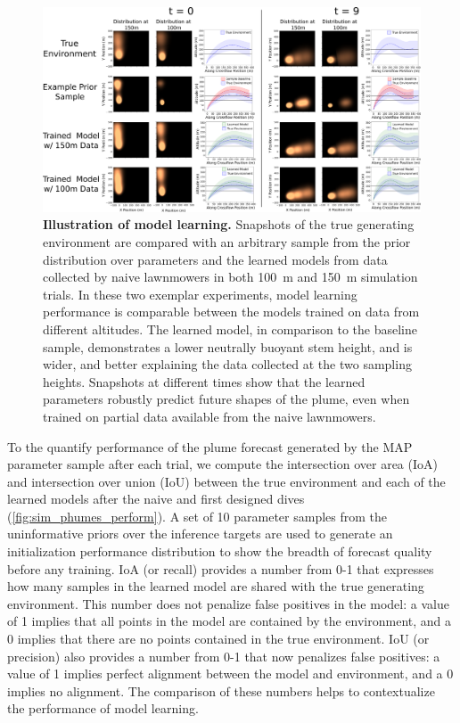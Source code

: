 \begin{figure}[h!]
    \centering
    \includegraphics[width=\columnwidth]{figures/sim_mod.png}
    \caption{\textbf{Illustration of model learning.} Snapshots of the true generating environment are compared with an arbitrary sample from the prior distribution over \PHUMES parameters and the learned models from data collected by naive lawnmowers in both \SI{100}{\meter} and \SI{150}{\meter} simulation trials. In these two exemplar experiments, model learning performance is comparable between the \PHUMES models trained on data from different altitudes. The learned model, in comparison to the baseline sample, demonstrates a lower neutrally buoyant stem height, and is wider, and better explaining the data collected at the two sampling heights. Snapshots at different times show that the learned parameters robustly predict future shapes of the plume, even when trained on partial data available from the naive lawnmowers.}
    \label{fig:sim_model}
\end{figure}

To the quantify performance of the plume forecast generated by the MAP parameter sample after each trial, we compute the intersection over area (IoA) and intersection over union (IoU) between the true environment and each of the learned models after the naive and first \PHORTEX designed dives (\cref{fig:sim_phumes_perform}). A set of 10 parameter samples from the uninformative priors over the inference targets are used to generate an initialization performance distribution to show the breadth of forecast quality before any training. IoA (or recall) provides a number from 0-1 that expresses how many samples in the learned model are shared with the true generating environment. This number does not penalize false positives in the model: a value of 1 implies that all points in the model are contained by the environment, and a 0 implies that there are no points contained in the true environment. IoU (or precision) also provides a number from 0-1 that now penalizes false positives: a value of 1 implies perfect alignment between the model and environment, and a 0 implies no alignment. The comparison of these numbers helps to contextualize the performance of model learning. 

